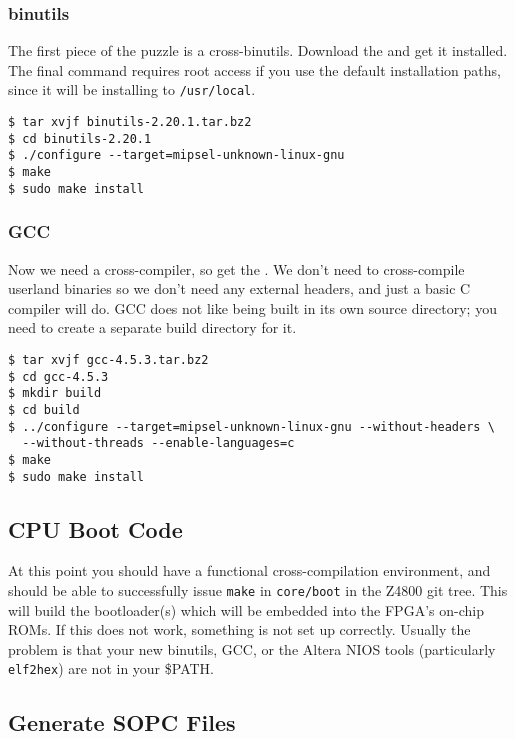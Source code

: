 \subsubsection{binutils}

The first piece of the puzzle is a cross-binutils. Download the
 and get it installed. The final command
requires root access if you use the default installation paths, since it will
be installing to \verb+/usr/local+.
\begin{verbatim}
$ tar xvjf binutils-2.20.1.tar.bz2
$ cd binutils-2.20.1
$ ./configure --target=mipsel-unknown-linux-gnu
$ make
$ sudo make install
\end{verbatim}

\subsubsection{GCC}

Now we need a cross-compiler, so get the . We
don't need to cross-compile userland binaries so we don't need any external
headers, and just a basic C compiler will do. GCC does not like being built in
its own source directory; you need to create a separate build directory for it.

\begin{verbatim}
$ tar xvjf gcc-4.5.3.tar.bz2
$ cd gcc-4.5.3
$ mkdir build
$ cd build
$ ../configure --target=mipsel-unknown-linux-gnu --without-headers \
  --without-threads --enable-languages=c
$ make
$ sudo make install
\end{verbatim}

\subsection{CPU Boot Code}

At this point you should have a functional cross-compilation environment, and
should be able to successfully issue \verb+make+ in \verb+core/boot+ in the
Z4800 git tree. This will build the bootloader(s) which will be embedded into
the FPGA's on-chip ROMs. If this does not work, something is not set up
correctly.  Usually the problem is that your new binutils, GCC, or the Altera
NIOS tools (particularly \verb+elf2hex+) are not in your \$PATH.

\subsection{Generate SOPC Files}

